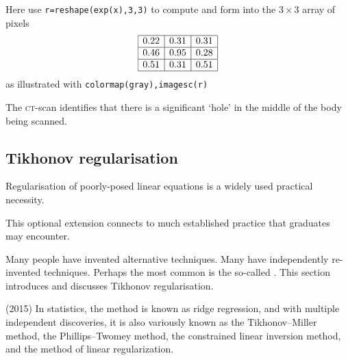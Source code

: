 \begin{example}
\begin{solution}
\begin{enumerate}
{}%
%
Here use \verb|r=reshape(exp(x),3,3)| to compute and form into the \(3\times3\) array of pixels
\begin{equation*}
\begin{array}{|r|r|r|}
\hline 0.22&0.31&0.31
\\\hline 0.46&0.95&0.28
\\\hline 0.51&0.31&0.51
\\\hline
\end{array}
\end{equation*}
as illustrated  with \verb|colormap(gray),imagesc(r)|
\end{enumerate}
The \textsc{ct}-scan identifies that there is a significant `hole' in the middle of the body being scanned.
\end{solution}
\end{example}














\subsection{Tikhonov regularisation}


Regularisation of poorly-posed linear equations is a widely used practical necessity.
\begin{aside} This optional extension connects to much established practice that graduates may encounter.\end{aside}%
Many people have invented alternative techniques.
Many have independently re-invented techniques.
Perhaps the most common is the so-called .
This section introduces and discusses Tikhonov regularisation.

\begin{quoted}{ (2015)}
In statistics, the method is known as ridge regression, and with multiple independent discoveries, it is also variously known as the Tikhonov--Miller method, the Phillips--Twomey method, the constrained linear inversion method, and the method of linear regularization.
\end{quoted}


